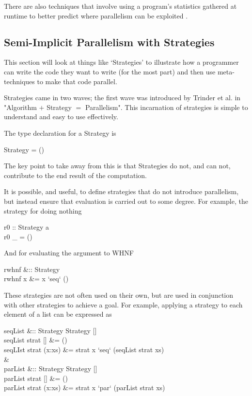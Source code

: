     There are also techniques that involve using a program's statistics
    gathered at runtime to better predict where parallelism can be exploited
    \citep{feedbackImplicit}.

\subsection{Semi-Implicit Parallelism with Strategies}
    This section will look at things like `Strategies' to illustrate how a
programmer can write the code they want to write (for the most part) and then
use meta-techniques to make that code parallel.

Strategies came in two waves; the first wave was introduced by Trinder et al. in
"Algorithm \(+\) Strategy \(=\) Parallelism". This incarnation of strategies is
simple to understand and easy to use effectively.

The type declaration for a Strategy is

\begin{haskell}
 Strategy \hasalpha = \hasalpha \to ()
\end{haskell}

The key point to take away from this is that Strategies do not, and can not,
contribute to the end result of the computation.

It is possible, and useful, to define strategies that do not introduce
parallelism, but instead ensure that evaluation is carried out to some degree.
For example, the strategy for doing nothing

\begin{haskell}
r0 :: Strategy a\\
r0 \_ = ()
\end{haskell}

And for evaluating the argument to WHNF

\begin{haskell}
rwhnf   &:: Strategy \hasalpha\\
rwhnf x &= x `seq` ()
\end{haskell}

These strategies are not often used on their own, but are used in conjunction
with other strategies to achieve a goal. For example, applying a strategy to
each element of a list can be expressed as


\begin{haskell}
seqList &:: Strategy \hasalpha \to Strategy [\hasalpha]\\
seqList strat [] &= ()\\
seqLIst strat (x:xs) &= strat x `seq` (seqList strat xs)\\
\quad&\quad \\
parList &:: Strategy \hasalpha \to Strategy [\hasalpha] \\
parList strat [] &= () \\
parList strat (x:xs) &= strat x `par` (parList strat xs)
\end{haskell}

